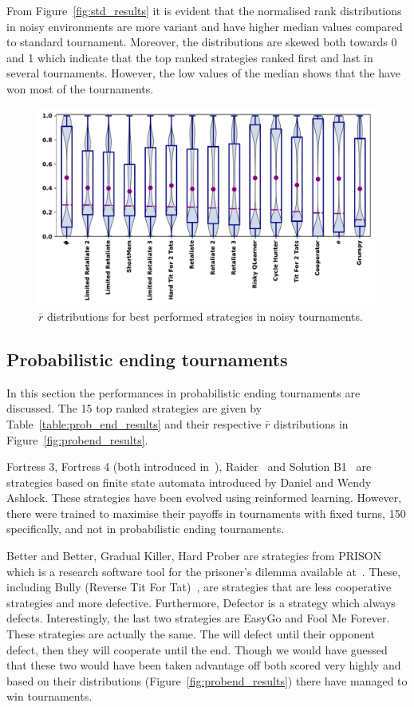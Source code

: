 \documentclass{article}
\begin{document}
From Figure~\ref{fig:std_results} it is evident that the normalised rank distributions
in noisy environments are more variant and have higher median values compared
to standard tournament. Moreover, the distributions are skewed both towards
0 and 1 which indicate that the top ranked strategies ranked first and last
in several tournaments. However, the low values of the median shows that the
have won most of the tournaments.

\begin{figure}[!htbp]
    \centering
    \includegraphics[width=.8\textwidth]{../images/performance_noise.pdf}
    \caption{\(\bar{r}\) distributions for best performed strategies in noisy tournaments.}
    \label{fig:noisy_results}
\end{figure}

\subsection{Probabilistic ending tournaments}\label{subsection:probend_tournament}

In this section the performances in probabilistic ending tournaments are discussed.
The 15 top ranked strategies are given by Table~\ref{table:prob_end_results}
and their respective $\bar{r}$ distributions in Figure~\ref{fig:probend_results}.

Fortress 3, Fortress 4 (both introduced in~\cite{Ashlock2006}),
Raider~\cite{Ashlock2014} and Solution B1~\cite{Ashlock2014} are strategies
based on finite state automata introduced by Daniel and Wendy Ashlock. These
strategies have been evolved using reinformed learning. However, there were
trained to maximise their payoffs in tournaments with fixed turns, 150
specifically, and not in probabilistic ending tournaments.

Better and Better, Gradual Killer, Hard Prober are strategies from PRISON which
is a research software tool for the prisoner's dilemma available
at~\cite{prison}. These, including Bully (Reverse Tit For
Tat)~\cite{Nachbar1992}, are strategies that are less cooperative strategies and
more defective. Furthermore, Defector is a strategy which always defects.
Interestingly, the last two strategies are EasyGo and Fool Me Forever. These
strategies are actually the same. The will defect until their opponent defect,
then they will cooperate until the end. Though we would have guessed that these
two would have been taken advantage off both scored very highly and based on
their distributions (Figure~\ref{fig:probend_results}) there have managed to win
tournaments.
\end{document}
